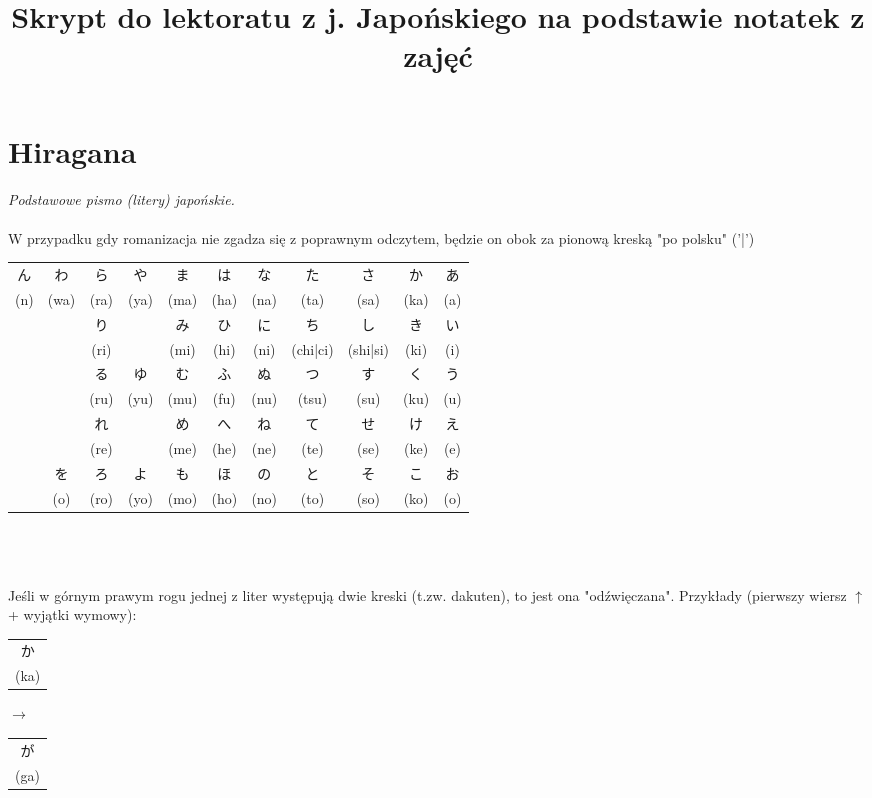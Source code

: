 \documentclass[10pt, a4paper]{article}
\begin{document}
	\title{Skrypt do lektoratu z j. Japońskiego na podstawie notatek z zajęć}
	\maketitle
	\newpage
	
	\tableofcontents
	\newpage
	
	\section{Hiragana}
	{\large \textit{Podstawowe pismo (litery) japońskie.}}\\\\
	W przypadku gdy romanizacja nie zgadza się z poprawnym odczytem, będzie on obok za pionową kreską "po polsku" ('|') \\
	\def\arraystretch{1.25}%
	\begin{tabular}{|c|c|c|c|c|c|c|c|c|c|c|}
		\hline
		ん & わ & ら & や & ま & は & な & た & さ & か & あ\\
		(n\footnotemark) & (wa) & (ra) & (ya) & (ma) & (ha) & (na) & (ta) & (sa) & (ka) & (a) \\
		\hline
		& & り & & み & ひ & に & ち & し & き & い \\
		& & (ri) & & (mi) & (hi) & (ni) & (chi|ci) & (shi|si) & (ki) & (i) \\
		\hline
		& & る & ゆ & む & ふ & ぬ & つ & す & く & う \\
		& & (ru) & (yu) & (mu) & (fu\footnotemark) & (nu) & (tsu) & (su) & (ku) & (u) \\
		\hline
		& & れ & & め & へ & ね & て & せ & け & え \\
		& & (re) & & (me) & (he) & (ne) & (te) & (se) & (ke) & (e) \\
		\hline
		& を & ろ & よ & も & ほ & の & と & そ & こ & お \\
		& (o\footnotemark) & (ro) & (yo) & (mo) & (ho) & (no) & (to) & (so) & (ko) & (o) \\
		\hline
	\end{tabular} \\ \\ \\
	Jeśli w górnym prawym rogu jednej z liter występują dwie kreski (t.zw. dakuten), to jest ona "odźwięczana". Przykłady (pierwszy wiersz $\uparrow$ + wyjątki wymowy): \\
	\def\arraystretch{0.75}%
	\begin{tabular}{c}か \\ (ka) \end{tabular} $\to$ \begin{tabular}{c}が \\ (ga) \end{tabular} \\
\end{document}
